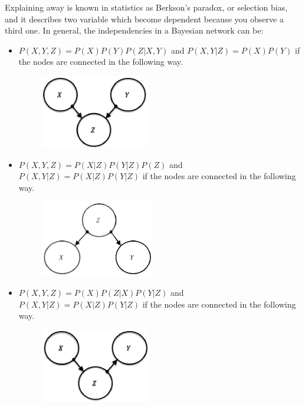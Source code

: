 \documentclass[12pt, a4paper]{report}
\begin{document}
    Explaining away is known in statistics as Berkson's paradox, or selection bias, and it describes two variable which become dependent 
    because you observe a third one. In general, the independencies in a Bayesian network can be: 
    \begin{itemize}
        \item $P(X,Y,Z)=P(X)P(Y)P(Z|X,Y)$ and $P(X,Y|Z)=P(X)P(Y)$ if the nodes are connected in the following way. 
            \begin{figure}[H]
                \centering
                \includegraphics[width=0.2\linewidth]{images/independencies1.png}
            \end{figure}
        \item $P(X,Y,Z)=P(X|Z)P(Y|Z)P(Z)$ and $P(X,Y|Z)=P(X|Z)P(Y|Z)$ if the nodes are connected in the following way. 
            \begin{figure}[H]
                \centering
                \includegraphics[width=0.2\linewidth]{images/independencies2.png}
            \end{figure}
        \item $P(X,Y,Z)=P(X)P(Z|X)P(Y|Z)$ and $P(X,Y|Z)=P(X|Z)P(Y|Z)$ if the nodes are connected in the following way. 
            \begin{figure}[H]
                \centering
                \includegraphics[width=0.2\linewidth]{images/independencies3.png}
            \end{figure}
    \end{itemize}
\end{document}
